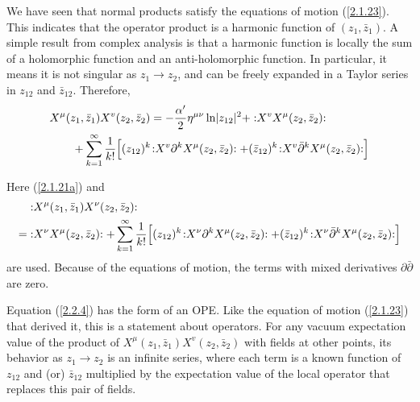 We have seen that normal products satisfy the equations of motion (\ref{2.1.23}). This indicates that the operator product is a harmonic function of $(z_{1}, \bar{z}_{1})$. A simple result from complex analysis is that a harmonic function is locally the sum of a holomorphic function and an anti-holomorphic function. In particular, it means it is not singular as $z_{1} \rightarrow z_{2}$, and can be freely expanded in a Taylor series in $z_{12}$ and $\bar{z}_{12}$.    
Therefore,    
\begin{align}
	&X^{\mu}(z_{1}, \bar{z}_{1}) X^{v}(z_{2}, \bar{z}_{2})=-\frac{\alpha^{\prime}}{2} \eta^{\mu \nu} \ln \lvert z_{12}\rvert^{2}+ 
	:\mathrel{ X^{v} X^{\mu}(z_{2}, \bar{z}_{2})}:  \nonumber \\
	&\qquad +\sum_{k=1}^{\infty} \frac{1}{k!}\Bigl[(z_{12})^{k}\!
	:\mathrel{X^{v} \partial^{k} X^{\mu}(z_{2}, \bar{z}_{2})}:+
	(\bar{z}_{12})^{k}\!:\mathrel{ X^{v} \bar{\partial}^{k} X^{\mu}(z_{2}, \bar{z}_{2})}:\Bigr] \label{2.2.4}
\end{align}
\begin{tcolorbox}[breakable]
	\begin{remark}
		Here (\ref{2.1.21a}) and    
		\begin{align*}
			&:\mathrel{X^{\mu}(z_{1},\bar{z}_{1}) X^{\nu}(z_{2}, \bar{z}_{2})}:\\
			=&: \mathrel{ X^{\nu} X^{\mu}(z_{2},\bar{z}_{2})}:+\sum_{k=1}^{\infty} \frac{1}{k !}\Bigl[(z_{12})^{k}\!:\mathrel{X^{\nu} \partial^{k} X^{\mu}(z_{2}, \bar{z}_{2})}:+(\bar{z}_{12})^{k}\!:\mathrel{X^{\nu} \bar{\partial}^{k} X^{\mu}(z_{2}, \bar{z}_{2})}:\Bigr]
		\end{align*}
		are used. Because of the equations of motion, the terms with mixed derivatives $\partial \bar{\partial}$ are zero.    
	\end{remark}
\end{tcolorbox}


Equation (\ref{2.2.4}) has the form of an OPE. Like the equation of motion (\ref{2.1.23}) that derived it, this is a statement about operators. For any vacuum expectation value of the product of $X^{\mu}(z_{1},\bar{z}_{1}) X^{v}(z_{2},\bar{z}_{2})$ with fields at other points, its behavior as $z_{1}\to z_{2}$ is an infinite series, where each term is a known function of $z_{12}$ and (or) $\bar{z}_{12}$ multiplied by the expectation value of the local operator that replaces this pair of fields.    

